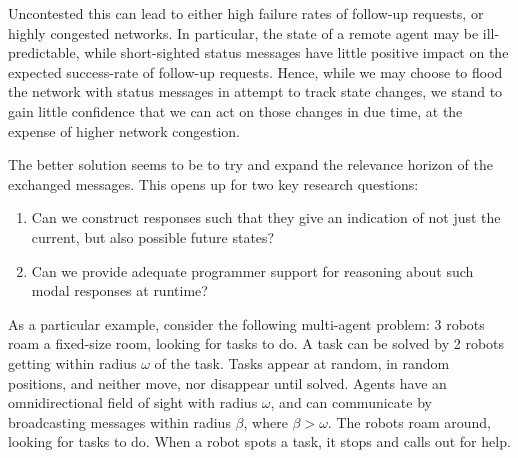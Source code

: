 \documentclass[conference]{IEEEtran}
\begin{document}
Uncontested this can lead to either high failure rates of follow-up
requests, or highly congested networks. In particular, the state of a
remote agent may be ill-predictable, while short-sighted status
messages have little positive impact on the expected success-rate of
follow-up requests. Hence, while we may choose to flood the network
with status messages in attempt to track state changes, we stand to
gain little confidence that we can act on those changes in due time,
at the expense of higher network congestion.

The better solution seems to be to try and expand the relevance
horizon of the exchanged messages. This opens up for two key
research questions:

\begin{enumerate}[(1)]

\item Can we construct responses such that they give an indication of
not just the current, but also possible future states?

\item Can we provide adequate programmer support for reasoning about
such modal responses at runtime?



\end{enumerate}


As a particular example, consider the following multi-agent problem: 3
robots roam a fixed-size room, looking for tasks to do. A task can be
solved by 2 robots getting within radius $\omega$ of the task. Tasks
appear at random, in random positions, and neither move, nor disappear
until solved. Agents have an omnidirectional field of sight with
radius $\omega$, and can communicate by broadcasting messages within
radius $\beta$, where $\beta>\omega$. The robots roam around, looking
for tasks to do. When a robot spots a task, it stops and calls out for
help.


\end{document}
